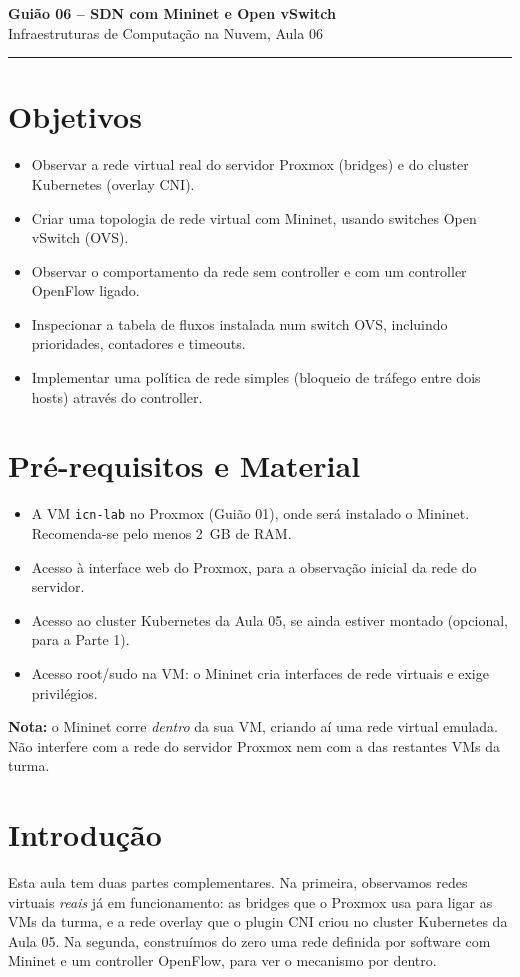 \documentclass[11pt,a4paper]{article}
\newcommand{\guiaotitle}[2]{%
  \begin{center}
  {\Large\bfseries\color{TextEspresso} #1}\\[0.3cm]
  {\normalsize\color{NudeTaupe} #2}\\[0.2cm]
  {\color{NudeTaupe}\rule{4cm}{0.5pt}}
  \end{center}
  \vspace{0.5cm}
}
\begin{document}
\guiaotitle{Guião 06 -- SDN com Mininet e Open vSwitch}{Infraestruturas de Computação na Nuvem, Aula 06}

\section{Objetivos}
\begin{itemize}[itemsep=0.2cm]
  \item Observar a rede virtual real do servidor Proxmox (bridges) e do cluster Kubernetes (overlay CNI).
  \item Criar uma topologia de rede virtual com Mininet, usando switches Open vSwitch (OVS).
  \item Observar o comportamento da rede sem controller e com um controller OpenFlow ligado.
  \item Inspecionar a tabela de fluxos instalada num switch OVS, incluindo prioridades, contadores e timeouts.
  \item Implementar uma política de rede simples (bloqueio de tráfego entre dois hosts) através do controller.
\end{itemize}

\section{Pré-requisitos e Material}
\begin{itemize}[itemsep=0.2cm]
  \item A VM \texttt{icn-lab} no Proxmox (Guião 01), onde será instalado o Mininet. Recomenda-se pelo menos 2~GB de RAM.
  \item Acesso à interface web do Proxmox, para a observação inicial da rede do servidor.
  \item Acesso ao cluster Kubernetes da Aula 05, se ainda estiver montado (opcional, para a Parte 1).
  \item Acesso root/sudo na VM: o Mininet cria interfaces de rede virtuais e exige privilégios.
\end{itemize}

\textbf{Nota:} o Mininet corre \emph{dentro} da sua VM, criando aí uma rede virtual emulada. Não interfere com a rede do servidor Proxmox nem com a das restantes VMs da turma.

\section{Introdução}
Esta aula tem duas partes complementares. Na primeira, observamos redes virtuais \emph{reais} já em funcionamento: as bridges que o Proxmox usa para ligar as VMs da turma, e a rede overlay que o plugin CNI criou no cluster Kubernetes da Aula 05. Na segunda, construímos do zero uma rede definida por software com Mininet e um controller OpenFlow, para ver o mecanismo por dentro.
\end{document}
